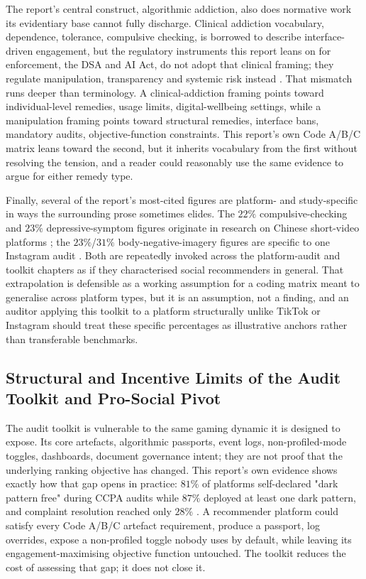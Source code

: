 \documentclass[11pt]{article}
\begin{document}
The report's central construct, algorithmic addiction, also does normative work its evidentiary base cannot fully discharge. Clinical addiction vocabulary, dependence, tolerance, compulsive checking, is borrowed to describe interface-driven engagement, but the regulatory instruments this report leans on for enforcement, the DSA and AI Act, do not adopt that clinical framing; they regulate manipulation, transparency and systemic risk instead \parencites[12]{6502223}[10]{2977039}. That mismatch runs deeper than terminology. A clinical-addiction framing points toward individual-level remedies, usage limits, digital-wellbeing settings, while a manipulation framing points toward structural remedies, interface bans, mandatory audits, objective-function constraints. This report's own Code A/B/C matrix leans toward the second, but it inherits vocabulary from the first without resolving the tension, and a reader could reasonably use the same evidence to argue for either remedy type.

Finally, several of the report's most-cited figures are platform- and study-specific in ways the surrounding prose sometimes elides. The $22\%$ compulsive-checking and $23\%$ depressive-symptom figures originate in research on Chinese short-video platforms \parencites[2]{3303310}[20]{3303310}; the $23\%$/$31\%$ body-negative-imagery figures are specific to one Instagram audit \parencites[3]{3303310}. Both are repeatedly invoked across the platform-audit and toolkit chapters as if they characterised social recommenders in general. That extrapolation is defensible as a working assumption for a coding matrix meant to generalise across platform types, but it is an assumption, not a finding, and an auditor applying this toolkit to a platform structurally unlike TikTok or Instagram should treat these specific percentages as illustrative anchors rather than transferable benchmarks.

\subsection{Structural and Incentive Limits of the Audit Toolkit and Pro-Social Pivot}
\label{sec:structural_incentive_limits} The audit toolkit is vulnerable to the same gaming dynamic it is designed to expose. Its core artefacts, algorithmic passports, event logs, non-profiled-mode toggles, dashboards, document governance intent; they are not proof that the underlying ranking objective has changed. This report's own evidence shows exactly how that gap opens in practice: $81\%$ of platforms self-declared "dark pattern free" during CCPA audits while $87\%$ deployed at least one dark pattern, and complaint resolution reached only $28\%$ \parencites[12]{6295677}[2]{6295677}. A recommender platform could satisfy every Code A/B/C artefact requirement, produce a passport, log overrides, expose a non-profiled toggle nobody uses by default, while leaving its engagement-maximising objective function untouched. The toolkit reduces the cost of assessing that gap; it does not close it.
\end{document}
